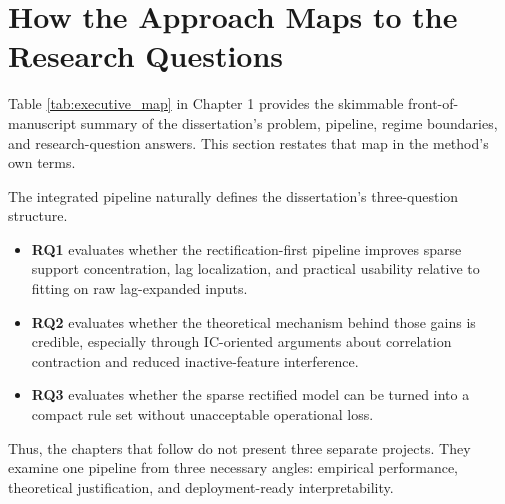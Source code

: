 \section{How the Approach Maps to the Research Questions}

Table \ref{tab:executive_map} in Chapter 1 provides the skimmable front-of-manuscript summary of the dissertation's problem, pipeline, regime boundaries, and research-question answers. This section restates that map in the method's own terms.

The integrated pipeline naturally defines the dissertation's three-question structure.
\begin{itemize}
    \item \textbf{RQ1} evaluates whether the rectification-first pipeline improves sparse support concentration, lag localization, and practical usability relative to fitting on raw lag-expanded inputs.
    \item \textbf{RQ2} evaluates whether the theoretical mechanism behind those gains is credible, especially through IC-oriented arguments about correlation contraction and reduced inactive-feature interference.
    \item \textbf{RQ3} evaluates whether the sparse rectified model can be turned into a compact rule set without unacceptable operational loss.
\end{itemize}

Thus, the chapters that follow do not present three separate projects. They examine one pipeline from three necessary angles: empirical performance, theoretical justification, and deployment-ready interpretability.
